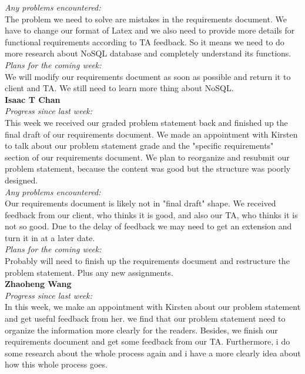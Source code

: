 \noindent\textit{Any problems encountered:}\\
 The problem we need to solve are mistakes in the requirements document. We have to change our format of Latex and we also need to provide more details for functional requirements according to TA feedback. So it means we need to do more research about NoSQL database and completely understand its functions.\\

\noindent\textit{Plans for the coming week:}\\
We will modify our requirements document as soon as possible and return it to client and TA. We still need to learn more thing about NoSQL.\\

\noindent\textbf{Isaac T Chan}\\
\noindent\textit{Progress since last week:}\\
This week we received our graded problem statement back and finished up the final draft of our requirements document. We made an appointment with Kirsten to talk about our problem statement grade and the "specific requirements" section of our requirements document. We plan to reorganize and resubmit our problem statement, because the content was good but the structure was poorly designed.\\

\noindent\textit{Any problems encountered:}\\
Our requirements document is likely not in "final draft" shape. We received feedback from our client, who thinks it is good, and also our TA, who thinks it is not so good. Due to the delay of feedback we may need to get an extension and turn it in at a later date.\\

\noindent\textit{Plans for the coming week:}\\
 Probably will need to finish up the requirements document and restructure the problem statement. Plus any new assignments.\\

\noindent\textbf{Zhaoheng Wang}\\
\noindent\textit{Progress since last week:}\\
In this week, we make an appointment with Kirsten about our problem statement and get useful feedback from her. we find that our problem statement need to organize the information more clearly for the readers. Besides, we finish our requirements document and get some feedback from our TA. Furthermore, i do some research about the whole process again and i have a more clearly idea about how this whole process goes.\\

